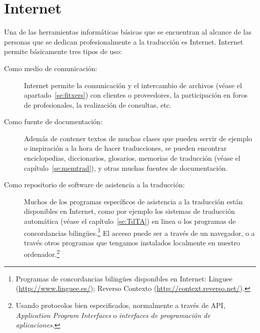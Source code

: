 \chapter{Internet} \label{se:Internet}  

Una de las herramientas informáticas básicas que se encuentran al alcance de las personas que se dedican profesionalmente a la traducción es Internet. Internet permite básicamente tres tipos de uso: \begin{description} \item[Como medio de comunicación:] Internet permite la comunicación y el intercambio de archivos (véase el apartado~\ref{se:fitxers}) con clientes o proveedores, la participación en foros de profesionales, la realización de consultas, etc. \item[Como fuente de documentación:] Además de contener textos de muchas clases que pueden servir de ejemplo o inspiración a la hora de hacer traducciones, se pueden encontrar enciclopedias, diccionarios, glosarios, memorias de traducción (véase el capítulo~\ref{se:memtrad}), y otras muchas fuentes de documentación. \item[Como repositorio de software de asistencia a la traducción:] Muchos de los programas específicos de asistencia a la traducción están disponibles en Internet, como por ejemplo los sistemas de traducción automática (véase el capítulo~\ref{se:TdTA}) en linea o los programas de concordancias bilingües.\footnote{Programas de concordancias bilingües disponibles en Internet: Linguee (\url{http://www.linguee.es/}); Reverso Contexto (\url{http://context.reverso.net/}).} El acceso puede ser a través de un navegador, o a través otros programas que tengamos instalados localmente en nuestro ordenador.\footnote{Usando protocolos bien especificados, normalmente a través de API, \emph{Application Program Interfaces} o \emph{interfaces de programación de aplicaciones}.} \end{description} 

